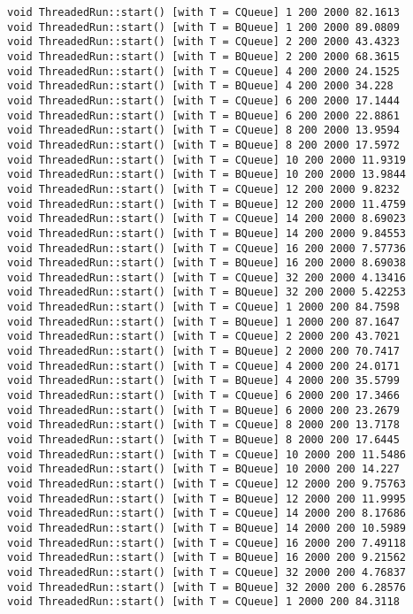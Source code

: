 \begin{verbatim}
void ThreadedRun::start() [with T = CQueue] 1 200 2000 82.1613
void ThreadedRun::start() [with T = BQueue] 1 200 2000 89.0809
void ThreadedRun::start() [with T = CQueue] 2 200 2000 43.4323
void ThreadedRun::start() [with T = BQueue] 2 200 2000 68.3615
void ThreadedRun::start() [with T = CQueue] 4 200 2000 24.1525
void ThreadedRun::start() [with T = BQueue] 4 200 2000 34.228
void ThreadedRun::start() [with T = CQueue] 6 200 2000 17.1444
void ThreadedRun::start() [with T = BQueue] 6 200 2000 22.8861
void ThreadedRun::start() [with T = CQueue] 8 200 2000 13.9594
void ThreadedRun::start() [with T = BQueue] 8 200 2000 17.5972
void ThreadedRun::start() [with T = CQueue] 10 200 2000 11.9319
void ThreadedRun::start() [with T = BQueue] 10 200 2000 13.9844
void ThreadedRun::start() [with T = CQueue] 12 200 2000 9.8232
void ThreadedRun::start() [with T = BQueue] 12 200 2000 11.4759
void ThreadedRun::start() [with T = CQueue] 14 200 2000 8.69023
void ThreadedRun::start() [with T = BQueue] 14 200 2000 9.84553
void ThreadedRun::start() [with T = CQueue] 16 200 2000 7.57736
void ThreadedRun::start() [with T = BQueue] 16 200 2000 8.69038
void ThreadedRun::start() [with T = CQueue] 32 200 2000 4.13416
void ThreadedRun::start() [with T = BQueue] 32 200 2000 5.42253
void ThreadedRun::start() [with T = CQueue] 1 2000 200 84.7598
void ThreadedRun::start() [with T = BQueue] 1 2000 200 87.1647
void ThreadedRun::start() [with T = CQueue] 2 2000 200 43.7021
void ThreadedRun::start() [with T = BQueue] 2 2000 200 70.7417
void ThreadedRun::start() [with T = CQueue] 4 2000 200 24.0171
void ThreadedRun::start() [with T = BQueue] 4 2000 200 35.5799
void ThreadedRun::start() [with T = CQueue] 6 2000 200 17.3466
void ThreadedRun::start() [with T = BQueue] 6 2000 200 23.2679
void ThreadedRun::start() [with T = CQueue] 8 2000 200 13.7178
void ThreadedRun::start() [with T = BQueue] 8 2000 200 17.6445
void ThreadedRun::start() [with T = CQueue] 10 2000 200 11.5486
void ThreadedRun::start() [with T = BQueue] 10 2000 200 14.227
void ThreadedRun::start() [with T = CQueue] 12 2000 200 9.75763
void ThreadedRun::start() [with T = BQueue] 12 2000 200 11.9995
void ThreadedRun::start() [with T = CQueue] 14 2000 200 8.17686
void ThreadedRun::start() [with T = BQueue] 14 2000 200 10.5989
void ThreadedRun::start() [with T = CQueue] 16 2000 200 7.49118
void ThreadedRun::start() [with T = BQueue] 16 2000 200 9.21562
void ThreadedRun::start() [with T = CQueue] 32 2000 200 4.76837
void ThreadedRun::start() [with T = BQueue] 32 2000 200 6.28576
void ThreadedRun::start() [with T = CQueue] 1 2000 200 84.3118

\end{verbatim}
